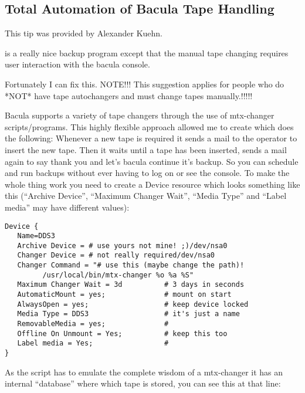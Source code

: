 {\subsection*{Total Automation of Bacula Tape Handling}
\label{automate}

This tip was provided by Alexander Kuehn. 

 is a really nice backup program except
that the manual tape changing requires user interaction with the bacula
console. 

Fortunately I can fix this.
NOTE!!! This suggestion applies for people who do *NOT* have tape autochangers
and must change tapes manually.!!!!! 

Bacula supports a variety of tape changers through the use of mtx-changer
scripts/programs. This highly flexible approach allowed me to create 
 which does the following:
Whenever a new tape is required it sends a mail to the operator to insert the
new tape. Then it waits until a tape has been inserted, sends a mail again to
say thank you and let's bacula continue it's backup.
So you can schedule and run backups without ever having to log on or see the
console.
To make the whole thing work you need to create a Device resource which looks
something like this (``Archive Device'', ``Maximum Changer Wait'', ``Media
Type'' and ``Label media'' may have different values): 

\footnotesize
\begin{verbatim}
Device {
   Name=DDS3
   Archive Device = # use yours not mine! ;)/dev/nsa0
   Changer Device = # not really required/dev/nsa0
   Changer Command = "# use this (maybe change the path)!
         /usr/local/bin/mtx-changer %o %a %S"
   Maximum Changer Wait = 3d          # 3 days in seconds
   AutomaticMount = yes;              # mount on start
   AlwaysOpen = yes;                  # keep device locked
   Media Type = DDS3                  # it's just a name
   RemovableMedia = yes;              #
   Offline On Unmount = Yes;          # keep this too
   Label media = Yes;                 #
}
\end{verbatim}
\normalsize

As the script has to emulate the complete wisdom of a mtx-changer it has an
internal ``database'' where which tape is stored, you can see this at that
line:

}
